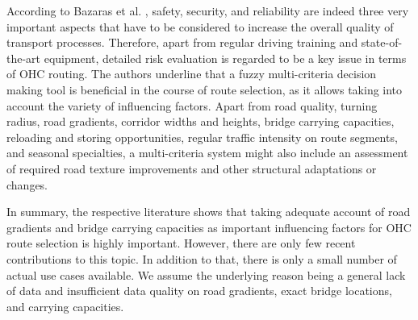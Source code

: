 \par
According to Bazaras et al. \cite{Bazaras.2013}, safety, security, and reliability are indeed three very important aspects that have to be considered to increase the overall quality of transport processes. Therefore, apart from regular driving training and state-of-the-art equipment, detailed risk evaluation is regarded to be a key issue in terms of OHC routing. The authors underline that a fuzzy multi-criteria decision making tool is beneficial in the course of route selection, as it allows taking into account the variety of influencing factors. Apart from road quality, turning radius, road gradients, corridor widths and heights, bridge carrying capacities, reloading and storing opportunities, regular traffic intensity on route segments, and seasonal specialties, a multi-criteria system might also include an assessment of required road texture improvements and other structural adaptations or changes.
\par
In summary, the respective literature shows that taking adequate account of road gradients and bridge carrying capacities as important influencing factors for OHC route selection is highly important. However, there are only few recent contributions to this topic. In addition to that, there is only a small number of actual use cases available. We assume the underlying reason being a general lack of data and insufficient data quality on road gradients, exact bridge locations, and carrying capacities.



%
%
%
%
